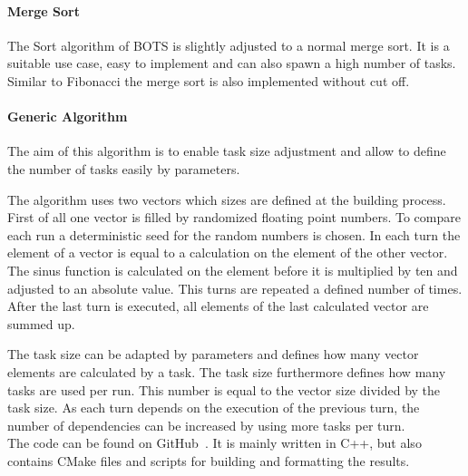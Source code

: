   \paragraph{Merge Sort}
  The Sort algorithm of BOTS is slightly adjusted to a normal merge sort.
  It is a suitable use case, easy to implement and can also spawn a high number of tasks.
  Similar to Fibonacci the merge sort is also implemented without cut off. 
  \\
  
  \paragraph{Generic Algorithm}
  The aim of this algorithm is to enable task size adjustment and allow to define the number of tasks easily by parameters.
  
  The algorithm uses two vectors which sizes are defined at the building process.
  First of all one vector is filled by randomized floating point numbers.
  To compare each run a deterministic seed for the random numbers is chosen.
  In each turn the element of a vector is equal to a calculation on the element of the other vector.
  The sinus function is calculated on the element before it is multiplied by ten and adjusted to an absolute value.
  This turns are repeated a defined number of times.
  After the last turn is executed, all elements of the last calculated vector are summed up.
  
  The task size can be adapted by parameters and defines how many vector elements are calculated by a task.
  The task size furthermore defines how many tasks are used per run.
  This number is equal to the vector size divided by the task size.
  As each turn depends on the execution of the previous turn, the number of dependencies can be increased by using more tasks per turn.
\\

The code can be found on GitHub~\cite{t0BEE.2020}.
It is mainly written in C++, but also contains CMake files and scripts for building and formatting the results.
